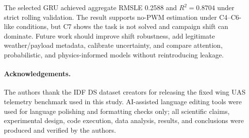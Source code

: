 \documentclass[runningheads,a4paper]{llncs}
\begin{document}
The selected GRU achieved aggregate RMSLE 0.2588 and $R^2=0.8704$ under strict rolling validation. The result supports no-PWM estimation under C4--C6-like conditions, but C7 shows the task is not solved and campaign shift can dominate. Future work should improve shift robustness, add legitimate weather/payload metadata, calibrate uncertainty, and compare attention, probabilistic, and physics-informed models without reintroducing leakage.

\paragraph{Acknowledgements.}
The authors thank the IDF DS dataset creators for releasing the fixed wing UAS telemetry benchmark used in this study. AI-assisted language editing tools were used for language polishing and formatting checks only; all scientific claims, experimental design, code execution, data analysis, results, and conclusions were produced and verified by the authors.
\end{document}

